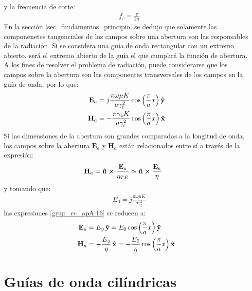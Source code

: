 y la frecuencia de corte:
\begin{align}
&f_c = \frac{v}{2a}
\label{ec_apA:74}
\end{align}
En la sección \ref{sec_fundamentos_principio} se dedujo que solamente las componenetes tangenciales de los campos sobre una abertura son las responsables de la radiación. Si se considera una guía de onda rectangular con un extremo abierto, será el extremo abierto de la guía el que cumplirá la función de abertura. A los fines de resolver el problema de radiación, puede considerarse que los campos sobre la abertura son las componentes transversales de los campos en la guía de onda, por lo que:
\begin{subequations}
\label{grup_ec_apA:16}
\begin{align}
\mathbf{E}_a &= j\frac{\pi\omega\mu K}{a\gamma_t^2}\cos\left(\frac{\pi}{a}x\right)\bm{\mathbf{\hat{y}}}
\label{ec_apA:75}\\
\mathbf{H}_a &= -\frac{\pi\gamma_zK}{a\gamma_t^2}\cos\left(\frac{\pi}{a}x\right)\bm{\mathbf{\hat{x}}}
\label{ec_apA:76}
\end{align}
\end{subequations}
Si las dimensiones de la abertura son grandes comparadas a la longitud de onda, los campos sobre la abertura $\mathbf{E}_a$ y $\mathbf{H}_a$ están relacionados entre sí a través de la expresión:
\begin{align}
&\mathbf{H}_a = \bm{\mathbf{\hat{n}}}\boldsymbol{\times}\frac{\mathbf{E}_a}{\eta_{TE}} \simeq \bm{\mathbf{\hat{n}}}\boldsymbol{\times}\frac{\mathbf{E}_a}{\eta}
\label{ec_apA:77}
\end{align}
y tomando que:
\begin{align}
&E_0 = j\frac{\pi\omega\mu K}{a\gamma_t^2}
\label{ec_apA:78}
\end{align}
las expresiones \eqref{grup_ec_apA:16} se reducen a:
\begin{subequations}
\label{grup_ec_apA:17}
\begin{align}
\mathbf{E}_a &= E_y\,\bm{\mathbf{\hat{y}}} = E_0\cos\left(\frac{\pi}{a}x\right)\bm{\mathbf{\hat{y}}}
\label{ec_apA:79}\\
\mathbf{H}_a &= -\frac{E_y}{\eta}\,\bm{\mathbf{\hat{x}}} = - \frac{E_0}{\eta}\cos\left(\frac{\pi}{a}x\right)\bm{\mathbf{\hat{x}}}
\label{ec_apA:80}
\end{align}
\end{subequations}

\section{Guías de onda cilíndricas}
\label{sec_apendice_a_guia_cili}

